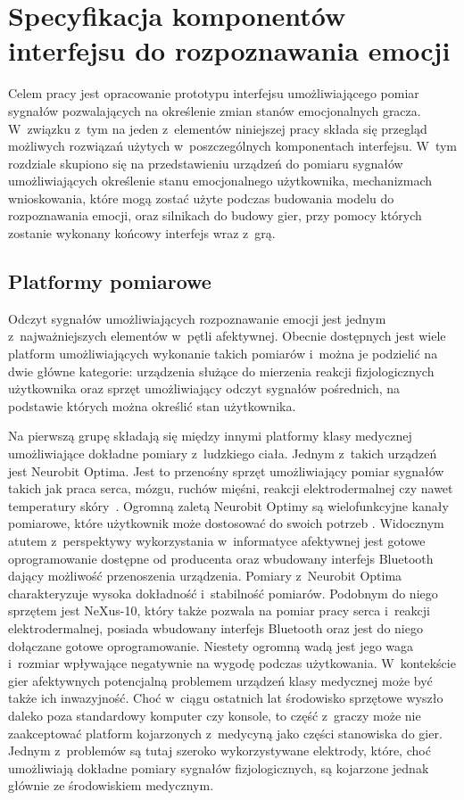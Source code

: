 \chapter{Specyfikacja komponentów interfejsu do rozpoznawania emocji}
\label{cha:specyfikacja}
Celem pracy jest opracowanie prototypu interfejsu umożliwiającego pomiar sygnałów pozwalających na określenie zmian stanów emocjonalnych gracza. W~związku z~tym na jeden z~elementów niniejszej pracy składa się przegląd możliwych rozwiązań użytych w~poszczególnych komponentach interfejsu. W~tym rozdziale skupiono się na przedstawieniu urządzeń do pomiaru sygnałów umożliwiających określenie stanu emocjonalnego użytkownika, mechanizmach wnioskowania, które mogą zostać użyte podczas budowania modelu do rozpoznawania emocji, oraz silnikach do budowy gier, przy pomocy których zostanie wykonany końcowy interfejs wraz z~grą.

\section{Platformy pomiarowe}
Odczyt sygnałów umożliwiających rozpoznawanie emocji jest jednym z~najważniejszych elementów w~pętli afektywnej. Obecnie dostępnych jest wiele platform umożliwiających wykonanie takich pomiarów i~można je podzielić na dwie główne kategorie: urządzenia służące do mierzenia reakcji fizjologicznych użytkownika oraz sprzęt umożliwiający odczyt sygnałów pośrednich, na podstawie których można określić stan użytkownika.

Na pierwszą grupę składają się między innymi platformy klasy medycznej umożliwiające dokładne pomiary z~ludzkiego ciała. Jednym z~takich urządzeń jest Neurobit Optima. Jest to przenośny sprzęt umożliwiający pomiar sygnałów takich jak praca serca, mózgu, ruchów mięśni, reakcji elektrodermalnej czy nawet temperatury skóry~\cite{neurobit_manual}. Ogromną zaletą Neurobit Optimy są wielofunkcyjne kanały pomiarowe, które użytkownik może dostosować do swoich potrzeb \cite{neurobit_manual}. Widocznym atutem z~perspektywy wykorzystania w~informatyce afektywnej jest gotowe oprogramowanie dostępne od producenta oraz wbudowany interfejs Bluetooth dający możliwość przenoszenia urządzenia. Pomiary z~Neurobit Optima charakteryzuje wysoka dokładność i~stabilność pomiarów. Podobnym do niego sprzętem jest NeXus-10, który także pozwala na pomiar pracy serca i~reakcji elektrodermalnej, posiada wbudowany interfejs Bluetooth oraz jest do niego dołączane gotowe oprogramowanie. Niestety ogromną wadą jest jego waga i~rozmiar wpływające negatywnie na wygodę podczas użytkowania. W~kontekście gier afektywnych potencjalną problemem urządzeń klasy medycznej może być także ich inwazyjność. Choć w~ciągu ostatnich lat środowisko sprzętowe wyszło daleko poza standardowy komputer czy konsole, to część z~graczy może nie zaakceptować platform kojarzonych z~medycyną jako części stanowiska do gier. Jednym z~problemów są tutaj szeroko wykorzystywane elektrody, które, choć umożliwiają dokładne pomiary sygnałów fizjologicznych, są kojarzone jednak głównie ze środowiskiem medycznym.


